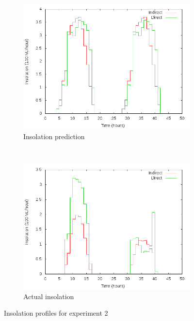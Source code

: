 \begin{figure}
	\centering
	\begin{subfigure}[b]{0.45\textwidth}
		\includegraphics[width=\textwidth]{images/insolation-prediction}
		\caption{Insolation prediction}
		\label{fig:insolation-error-p}
	\end{subfigure}
	~ %
	\begin{subfigure}[b]{0.45\textwidth}
		\includegraphics[width=\textwidth]{images/insolation-actual}
		\caption{Actual insolation}
		\label{fig:insolation-error-t}
	\end{subfigure}
	\caption{Insolation profiles for experiment 2}
	\label{fig:insolation-error}
\end{figure}

\section{}
